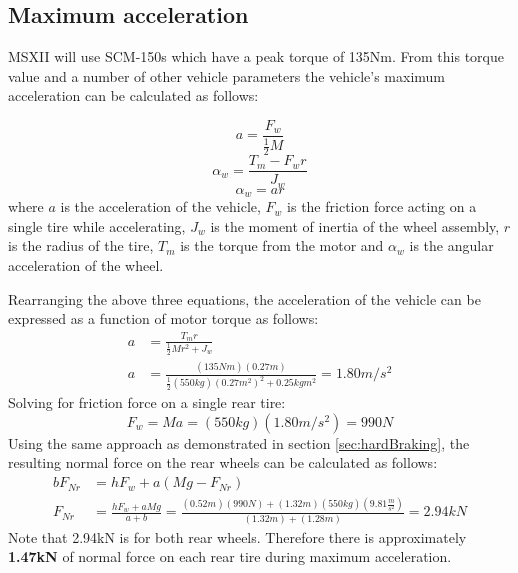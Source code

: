 \documentclass[12pt]{article}
\begin{document}
\subsection{Maximum acceleration}
MSXII will use SCM-150s which have a peak torque of 135Nm. From this torque value and a number of other vehicle parameters the vehicle's maximum acceleration can be calculated as follows: 

\begin{equation}
	a = \frac{F_w}{\frac{1}{2}M}
\end{equation}
\begin{equation}
	\alpha_w = \frac{T_m - F_wr}{J_w}
\end{equation}
\begin{equation}
	\alpha_w = ar
\end{equation}
where $a$ is the acceleration of the vehicle, $F_w$ is the friction force acting on a single tire while accelerating, $J_w$ is the moment of inertia of the wheel assembly, $r$ is the radius of the tire, $T_m$ is the torque from the motor and $\alpha_w$ is the angular acceleration of the wheel. 

Rearranging the above three equations, the acceleration of the vehicle can be expressed as a function of motor torque as follows: 
\begin{equation}
\begin{split}
	a &= \frac{T_m r}{\frac{1}{2}Mr^2 + J_w} \\
	a &= \frac{(135Nm)(0.27m)}{\frac{1}{2}(550kg)(0.27m^2)^2 + 0.25kgm^2} = 1.80m/s^2
\end{split}
\end{equation}
Solving for friction force on a single rear tire: 
\begin{equation}
	F_w = Ma = (550kg)(1.80m/s^2) = 990N
\end{equation}
Using the same approach as demonstrated in section \ref{sec:hardBraking}, the resulting normal force on the rear wheels can be calculated as follows: 
\begin{equation}
\begin{split}
	bF_{Nr} &= hF_{w} + a(Mg - F_{Nr})\\
	F_{Nr} &= \frac{hF_{w} + aMg}{a+b} = \frac{(0.52m)(990N)+(1.32m)(550kg)\left(9.81\frac{m}{s^2}\right)}{(1.32m)+(1.28m)} = 2.94kN
\end{split}
\end{equation}
Note that 2.94kN is for both rear wheels. Therefore there is approximately \textbf{1.47kN} of normal force on each rear tire during maximum acceleration.
\end{document}
